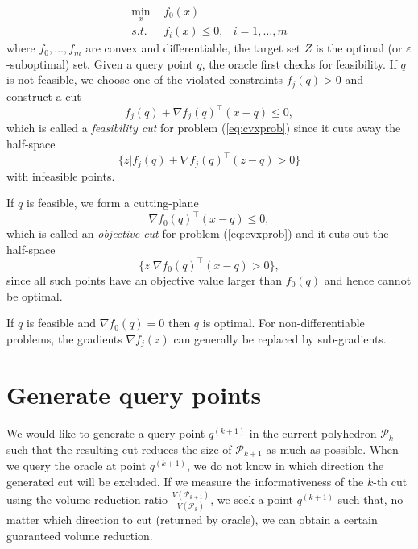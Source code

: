 \documentclass[10pt,a4paper]{article}
\newcommand{\eat}[1]{}
\begin{document}
\begin{equation}
\label{eq:cvxprob}
\begin{aligned}
\min_{x} ~& f_0(x)        & \\
s.t.~~   ~& f_i(x) \le 0, & i = 1, \dots, m
\end{aligned} 
\end{equation}
where $f_0, \dots, f_m$ are convex and differentiable, the target set $Z$ is the optimal (or $\varepsilon$-suboptimal) set.
Given a query point $q$, the oracle first checks for feasibility.
If $q$ is not feasible, we choose one of the violated constraints $f_j(q) > 0$ and construct a cut
\begin{equation*}
f_j(q) + \nabla f_j(q)^\top (x - q) \le 0,
\end{equation*}
which is called a \textit{feasibility cut} for problem (\ref{eq:cvxprob}) since it cuts away the half-space 
\begin{equation*}
\{z | f_j(q) + \nabla f_j(q)^\top (z - q) > 0 \}
\end{equation*}
with infeasible points.

\eat{
Proof of infeasibility.
}

\eat{
Multiple cuts for more than one violated constraints.
}
If $q$ is feasible, we form a cutting-plane
\begin{equation*}
\nabla f_0(q)^\top (x - q) \le 0,
\end{equation*}
which is called an \textit{objective cut} for problem (\ref{eq:cvxprob}) and it cuts out the half-space
\begin{equation*}
\{z | \nabla f_0(q)^\top (x - q) > 0 \},
\end{equation*}
since all such points have an objective value larger than $f_0(q)$ and hence cannot be optimal.

\eat{
Proof of non-optimal.
}

If $q$ is feasible and $\nabla f_0(q) = 0$ then $q$ is optimal.
For non-differentiable problems, the gradients $\nabla f_j(z)$ can generally be replaced by sub-gradients.


\section{Generate query points}
We would like to generate a query point $q^{(k+1)}$ in the current polyhedron $\mathcal{P}_{k}$ such that 
the resulting cut reduces the size of $\mathcal{P}_{k+1}$ as much as possible.
When we query the oracle at point $q^{(k+1)}$, we do not know in which direction the generated cut will be excluded.
If we measure the informativeness of the $k$-th cut using the volume reduction ratio $\frac{V(\mathcal{P}_{k+1})}{V(\mathcal{P}_{k})}$,
we seek a point $q^{(k+1)}$ such that, no matter which direction to cut (returned by oracle), we can obtain a certain guaranteed volume reduction.
\end{document}
